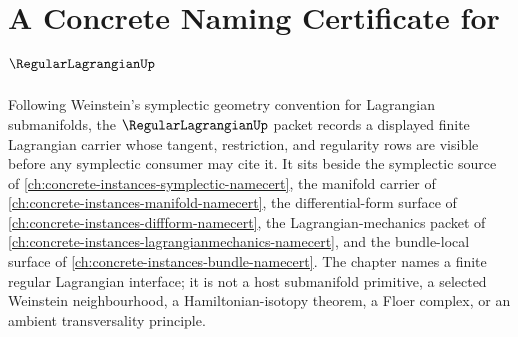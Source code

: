 \chapter{A Concrete Naming Certificate for $\RegularLagrangianUp$}
\label{ch:concrete-instances-regular-lagrangian-namecert}

Following Weinstein's symplectic geometry convention for Lagrangian submanifolds, the $\RegularLagrangianUp$ packet records a displayed finite Lagrangian carrier whose tangent, restriction, and regularity rows are visible before any symplectic consumer may cite it. It sits beside the symplectic source of \autoref{ch:concrete-instances-symplectic-namecert}, the manifold carrier of \autoref{ch:concrete-instances-manifold-namecert}, the differential-form surface of \autoref{ch:concrete-instances-diffform-namecert}, the Lagrangian-mechanics packet of \autoref{ch:concrete-instances-lagrangianmechanics-namecert}, and the bundle-local surface of \autoref{ch:concrete-instances-bundle-namecert}. The chapter names a finite regular Lagrangian interface; it is not a host submanifold primitive, a selected Weinstein neighbourhood, a Hamiltonian-isotopy theorem, a Floer complex, or an ambient transversality principle.

